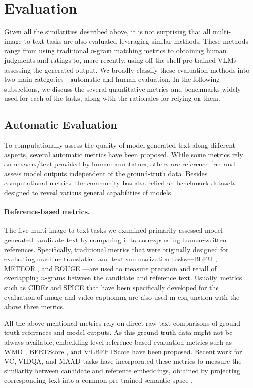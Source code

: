 \section{Evaluation}
\label{sec:eval}

Given all the similarities described above, it is not surprising that all multi-image-to-text tasks are also evaluated leveraging similar methods. These methods range from using traditional \textit{n}-gram matching metrics to obtaining human judgments and ratings to, more recently, using off-the-shelf pre-trained VLMs assessing the generated output. We broadly classify these evaluation methods into two main categories---automatic and human evaluation. In the following subsections, we discuss the several quantitative metrics and benchmarks widely used for each of the tasks, along with the rationales for relying on them.

\subsection{Automatic Evaluation}
\label{sec:5_1}

To computationally assess the quality of model-generated text along different aspects, several automatic metrics have been proposed. While some metrics rely on answers/text provided by human annotators, others are reference-free and assess model outputs independent of the ground-truth data. Besides computational metrics, the community has also relied on benchmark datasets designed to reveal various general capabilities of models.

\paragraph{Reference-based metrics.}
The five multi-image-to-text tasks we examined primarily assessed model-generated candidate text by comparing it to corresponding human-written references. Specifically, traditional metrics that were originally designed for evaluating machine translation and text summarization tasks---BLEU \cite{bleu}, METEOR \cite{meteor}, and ROUGE \cite{rouge}---are used to measure precision and recall of overlapping $\mathit{n}$-grams between the candidate and reference text. Usually, metrics such as CIDEr \cite{cider} and SPICE \cite{spice} that have been specifically developed for the evaluation of image and video captioning are also used in conjunction with the above three metrics.

All the above-mentioned metrics rely on direct raw text comparisons of ground-truth references and model outputs. As this ground-truth data might not be always available, embedding-level reference-based evaluation metrics such as WMD \cite{wmd}, BERTScore \cite{bertscore}, and ViLBERTScore \cite{vilbertscore} have been proposed. Recent work for \color{xkcdVividBlue}VC\color{black}, \color{xkcdVividBlue}VIDQA\color{black}, and \color{xkcdVividBlue}MAAD \color{black} tasks have incorporated these metrics to measure the similarity between candidate and reference embeddings, obtained by projecting corresponding text into a common pre-trained semantic space \cite{vc_swinbert,maad2,maad3}.

